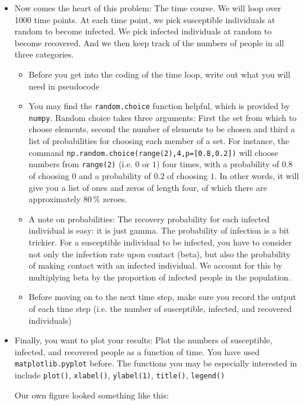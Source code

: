 \documentclass[pdflatex,a4paper]{article}
\begin{document}
\begin{itemize}
\item
Now comes the heart of this problem: The time course. We will loop over 1000 time points. At each time point, we pick susceptible individuals at random to become infected. We pick infected individuals at random to become recovered. And we then keep track of the numbers of people in all three categories. 
\begin{itemize}
\item
Before you get into the coding of the time loop, write out what you will need in pseudocode
\item
You may find the \verb=random.choice= function helpful, which is provided by \verb=numpy=. Random choice takes three arguments: First the set from which to choose elements, second the number of elements to be chosen and third a list of probabilities for choosing each member of a set. For instance, the command \verb_np.random.choice(range(2),4,p=[0.8,0.2])_ will choose numbers from \verb=range(2)= (i.e. \(0\) or \(1\)) four times, with a probability of \(0.8\) of choosing \(0\) and a probability of \(0.2\) of choosing \(1\). In other words, it will give you a list of ones and zeros of length four, of which there are approximately \(80\,\%\) zeroes. 
\item
A note on probabilities: The recovery probability for each infected individual is easy: it is just gamma. The probability of infection is a bit trickier. For a susceptible individual to be infected, you have to consider not only the infection rate upon contact (beta), but also the probability of making contact with an infected individual. We account for this by multiplying beta by the proportion of infected people in the population.
\item
Before moving on to the next time step, make sure you record the output of each time step (i.e. the number of susceptible, infected, and recovered individuals) 
\end{itemize}

\item
  Finally, you want to plot your results: Plot the numbers of susceptible, infected, and recovered people as a function of time. You have used \verb=matplotlib.pyplot= before. The functions you may be especially interested in include \verb=plot()=, \verb=xlabel()=, \verb=ylabel(1)=, \verb=title()=, \verb=legend()=

Our own figure looked something like this:


\end{itemize}
\end{document}
